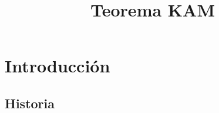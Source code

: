 \documentclass[8pt]{beamer}
\title[Teorema KAM] %
{\huge {Teorema KAM}}
\renewcommand{\>}{\rangle}
\newcommand{\<}{\langle}
\begin{document}
\begin{frame}
\titlepage 


\end{frame}
%
%


\section[Introducción]{Introducción}

\subsection[Historia]{Historia}
\end{document}
